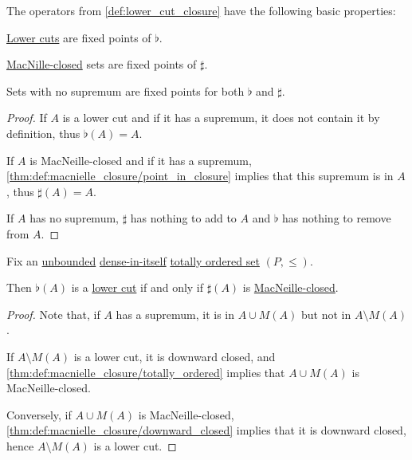 \begin{proposition}\label{thm:def:lower_cut_closure}
  The operators from \cref{def:lower_cut_closure} have the following basic properties:
  \begin{thmenum}
     \hyperref[def:lower_cut]{Lower cuts} are fixed points of \( \flat \).

     \hyperref[def:macnielle_closure]{MacNille-closed} sets are fixed points of \( \sharp \).

     Sets with no supremum are fixed points for both \( \flat \) and \( \sharp \).
  \end{thmenum}
\end{proposition}
\begin{proof}
   If \( A \) is a lower cut and if it has a supremum, it does not contain it by definition, thus \( \flat(A) = A \).

   If \( A \) is MacNeille-closed and if it has a supremum, \cref{thm:def:macnielle_closure/point_in_closure} implies that this supremum is in \( A \), thus \( \sharp(A) = A \).

   If \( A \) has no supremum, \( \sharp \) has nothing to add to \( A \) and \( \flat \) has nothing to remove from \( A \).
\end{proof}

\begin{proposition}\label{thm:lower_cut_characterization}
  Fix an \hyperref[def:extremal_points/bounds]{unbounded} \hyperref[def:dense_total_order]{dense-in-itself} \hyperref[def:totally_ordered_set]{totally ordered set} \( (P, \leq) \).

  Then \( \flat(A) \) is a \hyperref[def:lower_cut]{lower cut} if and only if \( \sharp(A) \) is \hyperref[def:macnielle_closure]{MacNeille-closed}.
\end{proposition}
\begin{proof}
  Note that, if \( A \) has a supremum, it is in \( A \cup M(A) \) but not in \( A \setminus M(A) \).

  \SufficiencySubProof If \( A \setminus M(A) \) is a lower cut, it is downward closed, and \cref{thm:def:macnielle_closure/totally_ordered} implies that \( A \cup M(A) \) is MacNeille-closed.

  \NecessitySubProof Conversely, if \( A \cup M(A) \) is MacNeille-closed, \cref{thm:def:macnielle_closure/downward_closed} implies that it is downward closed, hence \( A \setminus M(A) \) is a lower cut.
\end{proof}

